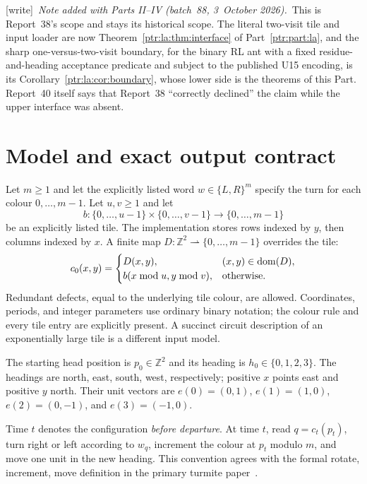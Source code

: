 \documentclass[11pt,letterpaper]{article}
\theoremstyle{definition}\newtheorem{definition}[theorem]{Definition}
\theoremstyle{remark}\newtheorem{remark}[theorem]{Remark}
\newcommand{\Z}{\mathbb Z}\newcommand{\N}{\mathbb N}\newcommand{\Zp}{\mathbb Z_{>0}}
\newcommand{\wtag}{\textup{[write]}}
\newcommand{\bnote}{\wtag\ \emph{Note added with Parts II--IV (batch~88, 3~October 2026).}}
\begin{document}
{\small\bnote\ This is Report~38's scope and stays its historical scope.
The literal two-visit tile and input loader are now Theorem~\ref{ptr:la:thm:interface}
of Part~\ref{ptr:part:la}, and the sharp one-versus-two-visit boundary, for
the binary RL ant with a fixed residue-and-heading acceptance predicate and
subject to the published U15 encoding, is its
Corollary~\ref{ptr:la:cor:boundary}, whose lower side is the theorems of this
Part. Report~40 itself says that Report~38 ``correctly declined'' the claim
while the upper interface was absent.\par}

\section{Model and exact output contract}\label{ptr:sec:model}
Let $m\ge1$ and let the explicitly listed word $w\in\{L,R\}^m$ specify the turn for each colour $0,\ldots,m-1$. Let $u,v\ge1$ and let
\[
 b:\{0,\ldots,u-1\}\times\{0,\ldots,v-1\}\longrightarrow\{0,\ldots,m-1\}
\]
be an explicitly listed tile. The implementation stores rows indexed by $y$, then columns indexed by $x$. A finite map $D:\Z^2\rightharpoonup\{0,\ldots,m-1\}$ overrides the tile:
\begin{equation}\label{ptr:eq:c0}
 c_0(x,y)=\begin{cases}
 D(x,y),&(x,y)\in\operatorname{dom}(D),\\
 b(x\bmod u,y\bmod v),&\text{otherwise}.
 \end{cases}
\end{equation}
Redundant defects, equal to the underlying tile colour, are allowed. Coordinates, periods, and integer parameters use ordinary binary notation; the colour rule and every tile entry are explicitly present. A succinct circuit description of an exponentially large tile is a different input model.

The starting head position is $p_0\in\Z^2$ and its heading is $h_0\in\{0,1,2,3\}$. The headings are north, east, south, west, respectively; positive $x$ points east and positive $y$ north. Their unit vectors are $e(0)=(0,1)$, $e(1)=(1,0)$, $e(2)=(0,-1)$, and $e(3)=(-1,0)$.

Time $t$ denotes the configuration \emph{before departure}. At time $t$, read $q=c_t(p_t)$, turn right or left according to $w_q$, increment the colour at $p_t$ modulo $m$, and move one unit in the new heading. This convention agrees with the formal rotate, increment, move definition in the primary turmite paper~\cite{maldonado}.
\end{document}
